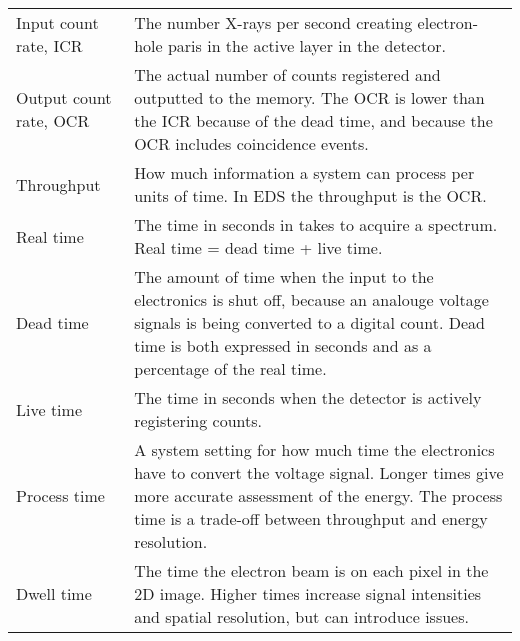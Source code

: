 \begin{table}[pht]
\begin{center}
\begin{tabular}{p{2.6cm}p{12cm}}
            Input count rate, ICR             & The number X-rays per second creating electron-hole paris in the active layer in the detector.                                                                                                                             \\
            Output count rate, OCR            & The actual number of counts registered and outputted to the memory. The OCR is lower than the ICR because of the dead time, and because the OCR includes coincidence events.                                               \\
            Throughput                        & How much information a system can process per units of time. In EDS the throughput is the OCR.                                                                                                                             \\
            Real time                         & The time in seconds in takes to acquire a spectrum. Real time = dead time + live time.                                                                                                                                      \\
            Dead time                         & The amount of time when the input to the electronics is shut off, because an analouge voltage signals is being converted to a digital count. Dead time is both expressed in seconds and as a percentage of the real time.  \\
            Live time                         & The time in seconds when the detector is actively registering counts.                                                                                                                                                      \\
            Process time                      & A system setting for how much time the electronics have to convert the voltage signal. Longer times give more accurate assessment of the energy. The process time is a trade-off between throughput and energy resolution. \\
            Dwell time                        & The time the electron beam is on each pixel in the 2D image. Higher times increase signal intensities and spatial resolution, but can introduce issues.                                                                    \\
            \hline
        \end{tabular}
    \end{center}
\end{table}